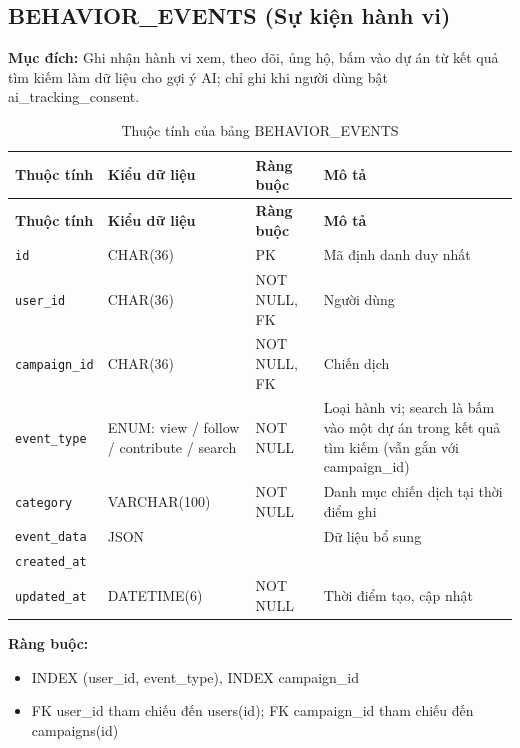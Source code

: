 \subsection{BEHAVIOR\_\allowbreak{}EVENTS (Sự kiện hành vi)}

\textbf{Mục đích:} Ghi nhận hành vi xem, theo dõi, ủng hộ, bấm vào dự án từ kết quả tìm kiếm làm dữ liệu cho gợi ý AI; chỉ ghi khi người dùng bật ai\_\allowbreak{}tracking\_\allowbreak{}consent.

{\small
\begin{longtable}{|P{3.2cm}|P{2.8cm}|P{2.2cm}|p{5.4cm}|}
    \caption{Thuộc tính của bảng BEHAVIOR\_\allowbreak{}EVENTS}
    \label{tab:behavior_events} \\
    \hline
    \textbf{Thuộc tính} & \textbf{Kiểu dữ liệu} & \textbf{Ràng buộc} & \textbf{Mô tả} \\
    \hline
    \endfirsthead
    \hline
    \textbf{Thuộc tính} & \textbf{Kiểu dữ liệu} & \textbf{Ràng buộc} & \textbf{Mô tả} \\
    \hline
    \endhead

    \texttt{id} & CHAR(36) & PK & Mã định danh duy nhất \\
    \hline
    \texttt{user\_\allowbreak{}id} & CHAR(36) & NOT NULL, FK & Người dùng \\
    \hline
    \texttt{campaign\_\allowbreak{}id} & CHAR(36) & NOT NULL, FK & Chiến dịch \\
    \hline
    \texttt{event\_\allowbreak{}type} & ENUM: view / follow / contribute / search & NOT NULL & Loại hành vi; search là bấm vào một dự án trong kết quả tìm kiếm (vẫn gắn với campaign\_\allowbreak{}id) \\
    \hline
    \texttt{category} & VARCHAR(100) & NOT NULL & Danh mục chiến dịch tại thời điểm ghi \\
    \hline
    \texttt{event\_\allowbreak{}data} & JSON &  & Dữ liệu bổ sung \\
    \hline
    \texttt{created\_\allowbreak{}at} &  &  &  \\
    \hline
    \texttt{updated\_\allowbreak{}at} & DATETIME(6) & NOT NULL & Thời điểm tạo, cập nhật \\
    \hline
\end{longtable}
}

\textbf{Ràng buộc:}
\begin{itemize}
    \item INDEX (user\_\allowbreak{}id, event\_\allowbreak{}type), INDEX campaign\_\allowbreak{}id
    \item FK user\_\allowbreak{}id tham chiếu đến users(id); FK campaign\_\allowbreak{}id tham chiếu đến campaigns(id)
\end{itemize}


